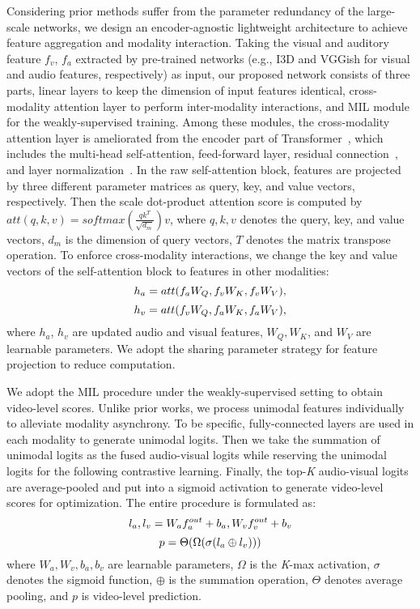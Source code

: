 \documentclass[sigconf]{acmart}
\begin{document}
Considering prior methods suffer from the parameter redundancy of the large-scale networks, we design an encoder-agnostic lightweight architecture to achieve feature aggregation and modality interaction. Taking the visual and auditory feature $f_v$, $f_a$ extracted by pre-trained networks (e.g., I3D and VGGish for visual and audio features, respectively) as input, our proposed network consists of three parts, linear layers to keep the dimension of input features identical, cross-modality attention layer to perform inter-modality interactions, and MIL module for the weakly-supervised training. Among these modules, the cross-modality attention layer is ameliorated from the encoder part of Transformer~\cite{vaswani2017attention}, which includes the multi-head self-attention, feed-forward layer, residual connection~\cite{he2016deep}, and layer normalization~\cite{ba2016layer}. In the raw self-attention block, features are projected by three different parameter matrices as query, key, and value vectors, respectively. Then the scale dot-product attention score is computed by $att(q, k, v) = softmax(\frac{qk^T}{\sqrt{d_m}})v$, where $q, k, v$ denotes the query, key, and value vectors, $d_m$ is the dimension of query vectors, $T$ denotes the matrix transpose operation. To enforce cross-modality interactions, we change the key and value vectors of the self-attention block to features in other modalities:
\begin{equation}
\small
    h_a = att(f_aW_Q, f_vW_K, f_vW_V),
\end{equation}
\begin{equation}
\small
    h_v = att(f_vW_Q, f_aW_K, f_aW_V),
\end{equation}
where $h_a$, $h_v$ are updated audio and visual features, $W_Q, W_K$, and $W_V$ are learnable parameters. We adopt the sharing parameter strategy for feature projection to reduce computation.

We adopt the MIL procedure under the weakly-supervised setting to obtain video-level scores. Unlike prior works, we process unimodal features individually to alleviate modality asynchrony. To be specific, fully-connected layers are used in each modality to generate unimodal logits. Then we take the summation of unimodal logits as the fused audio-visual logits while reserving the unimodal logits for the following contrastive learning. Finally, the top-\textit{K} audio-visual logits are average-pooled and put into a sigmoid activation to generate video-level scores for optimization. The entire procedure is formulated as:
\begin{equation}
\small
    l_a, l_v = W_af_a^{out}+b_a, W_vf_v^{out}+b_v
\end{equation}
\begin{equation}
\small
    p = \Theta(\Omega(\sigma(l_a \oplus l_v)))
\end{equation}
where $W_a, W_v, b_a, b_v$ are learnable parameters, $\Omega$ is the \textit{K}-max activation, $\sigma$ denotes the sigmoid function, $\oplus$ is the summation operation, $\Theta$ denotes average pooling, and $p$ is video-level prediction.
\end{document}
